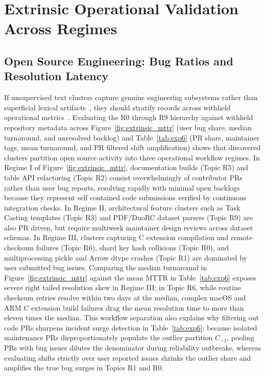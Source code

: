 \documentclass[sigconf,anonymous,pbalance]{acmart}
\begin{document}
\section{Extrinsic Operational Validation Across Regimes}

\subsection{Open Source Engineering: Bug Ratios and Resolution Latency}
If unsupervised text clusters capture genuine engineering subsystems rather than superficial lexical artifacts~\cite{hoyle2021automated}, they should stratify records across withheld operational metrics~\cite{chen2020incidental}. Evaluating the R0 through R9 hierarchy against withheld repository metadata across Figure~\ref{fig:extrinsic_mttr} (user bug share, median turnaround, and unresolved backlog) and Table~\ref{tab:exp6} (PR share, maintainer tags, mean turnaround, and PR filtered shift amplification) shows that discovered clusters partition open source activity into three operational workflow regimes. In Regime I of Figure~\ref{fig:extrinsic_mttr}, documentation builds (Topic R5) and table API refactoring (Topic R2) consist overwhelmingly of contributor PRs rather than user bug reports, resolving rapidly with minimal open backlogs because they represent self contained code submissions verified by continuous integration checks. In Regime II, architectural feature clusters such as Task Casting templates (Topic R3) and PDF/DuoRC dataset parsers (Topic R9) are also PR driven, but require multiweek maintainer design reviews across dataset schemas. In Regime III, clusters capturing C extension compilation and remote checksum failures (Topic R6), shard key hash collisions (Topic R0), and multiprocessing pickle and Arrow dtype crashes (Topic R1) are dominated by user submitted bug issues. Comparing the median turnaround in Figure~\ref{fig:extrinsic_mttr} against the mean MTTR in Table~\ref{tab:exp6} exposes severe right tailed resolution skew in Regime III: in Topic R6, while routine checksum retries resolve within two days at the median, complex macOS and ARM C extension build failures drag the mean resolution time to more than eleven times the median. This workflow separation also explains why filtering out code PRs sharpens incident surge detection in Table~\ref{tab:exp6}: because isolated maintenance PRs disproportionately populate the outlier partition $C_{-1}$, pooling PRs with bug issues dilutes the denominator during reliability outbreaks, whereas evaluating shifts strictly over user reported issues shrinks the outlier share and amplifies the true bug surges in Topics R1 and R0.
\end{document}
